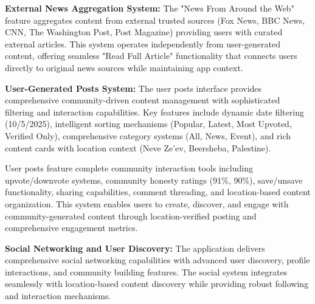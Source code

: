 \textbf{External News Aggregation System:}
The "News From Around the Web" feature aggregates content from external trusted sources (Fox News, BBC News, CNN, The Washington Post, Post Magazine) providing users with curated external articles. This system operates independently from user-generated content, offering seamless "Read Full Article" functionality that connects users directly to original news sources while maintaining app context.

\textbf{User-Generated Posts System:}
The user posts interface provides comprehensive community-driven content management with sophisticated filtering and interaction capabilities. Key features include dynamic date filtering (10/5/2025), intelligent sorting mechanisms (Popular, Latest, Most Upvoted, Verified Only), comprehensive category systems (All, News, Event), and rich content cards with location context (Neve Ze'ev, Beersheba, Palestine). 

User posts feature complete community interaction tools including upvote/downvote systems, community honesty ratings (91\%, 90\%), save/unsave functionality, sharing capabilities, comment threading, and location-based content organization. This system enables users to create, discover, and engage with community-generated content through location-verified posting and comprehensive engagement metrics.

\textbf{Social Networking and User Discovery:}
The application delivers comprehensive social networking capabilities with advanced user discovery, profile interactions, and community building features. The social system integrates seamlessly with location-based content discovery while providing robust following and interaction mechanisms.

